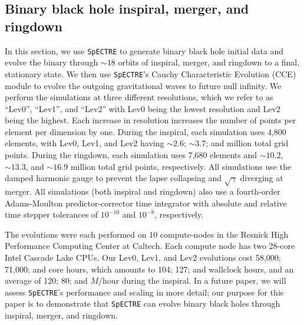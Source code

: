 \begin{bibunit}[unsrtnat]
\subsection{Binary black hole inspiral, merger, and ringdown\label{sec:binary
    black hole IMR}\label{sec:bbh results}}

In this section, we use \texttt{SpECTRE} to generate binary black hole initial
data and evolve the binary through $\sim18$ orbits of inspiral, merger, and
ringdown to a final, stationary state.  We then use \texttt{SpECTRE}'s Cauchy
Characteristic Evolution (CCE) module to evolve the outgoing gravitational waves
to future null infinity.  We perform the simulations at three different
resolutions, which we refer to as ``Lev0'', ``Lev1'', and ``Lev2'' with Lev0
being the lowest resolution and Lev2 being the highest. Each increase in
resolution increases the number of points per element per dimension by one.
During the inspiral, each simulation uses 4,800 elements, with Lev0, Lev1, and
Lev2 having $\sim2.6$; $\sim3.7$; and  million total grid
points. During the ringdown, each simulation uses 7,680 elements and $\sim10.2$,
$\sim13.3$, and $\sim16.9$ million total grid points, respectively. All
simulations use the damped harmonic gauge to prevent the lapse collapsing and
$\sqrt{\gamma}$ diverging at merger. All simulations (both inspiral and
ringdown) also use a fourth-order Adams-Moulton predictor-corrector time
integrator with absolute and relative time stepper tolerances of $10^{-10}$ and
$10^{-8}$, respectively.

The evolutions were each performed on 10 compute-nodes in the Resnick High
Performance Computing Center at Caltech. Each compute node has two 28-core Intel
Cascade Lake CPUs. Our Lev0, Lev1, and Lev2 evolutions cost 58,000; 71,000; and
 core hours, which amounts to 104; 127; and 
wallclock hours, and an average of 120; 80; and  $M$/hour during
the inspiral.  In a future paper, we will assess \texttt{SpECTRE}'s performance
and scaling in more detail; our purpose for this paper is to demonstrate that
\texttt{SpECTRE} can evolve binary black holes through inspiral, merger, and
ringdown.


\end{bibunit}
